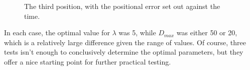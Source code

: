 \documentclass[a4paper]{article}
\begin{document}
\begin{figure}[htbp]
  \centering
  \caption{The third position, with the positional error set out against
         the time.}
  \label{fig:ik_plot3}
\end{figure}
\FloatBarrier

In each case, the optimal value for $\lambda$ was 5, while $D_{max}$ was either
50 or 20, which is a relatively large difference given the range of values. Of
course, three tests isn't enough to conclusively determine the optimal
parameters, but they offer a nice starting point for further practical testing.
\end{document}
